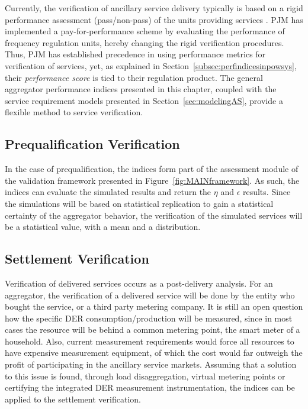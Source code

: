 Currently, the verification of ancillary service delivery typically is based on a rigid performance assessment (pass/non-pass) of the units providing services . PJM has implemented a pay-for-performance scheme by evaluating the performance of frequency regulation units, hereby changing the rigid verification procedures. Thus, PJM has established precedence in using performance metrics for verification of services, yet, as explained in Section~\ref{subsec:perfindicesinpowsys}, their \emph{performance score} is tied to their regulation product. The general aggregator performance indices presented in this chapter, coupled with the service requirement models presented in Section~\ref{sec:modelingAS}, provide a flexible method to service verification.
\subsection{Prequalification Verification}
In the case of prequalification, the indices form part of the assessment module of the validation framework presented in Figure~\ref{fig:MAINframework}. As such, the indices can evaluate the simulated results and return the $\eta$ and $\epsilon$ results. Since the simulations will be based on statistical replication to gain a statistical certainty of the aggregator behavior, the verification of the simulated services will be a statistical value, \eg with a mean and a distribution.

\subsection{Settlement Verification}
Verification of delivered services occurs as a post-delivery analysis. For an aggregator, the verification of a delivered service will be done by the entity who bought the service, or a third party metering company. It is still an open question how the specific DER consumption/production will be measured, since in most cases the resource will be behind a common metering point, \eg the smart meter of a household. Also, current measurement requirements would force all resources to have expensive measurement equipment, of which the cost would far outweigh the profit of participating in the ancillary service markets. Assuming that a solution to this issue is found, \eg through load disaggregation, virtual metering points or certifying the integrated DER measurement instrumentation, the indices can be applied to the settlement verification.

